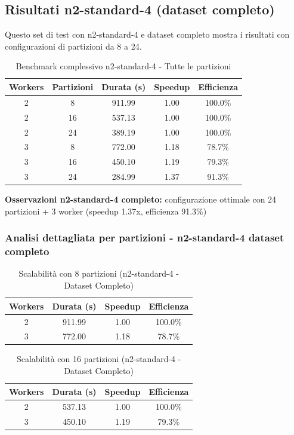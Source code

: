 \documentclass[8pt,a4paper]{article}
\begin{document}
\subsection{Risultati n2-standard-4 (dataset completo)}

Questo set di test con n2-standard-4 e dataset completo mostra i risultati con configurazioni di partizioni da 8 a 24.

\begin{table}[H]
\centering
\caption{Benchmark complessivo n2-standard-4 - Tutte le partizioni}
\label{tab:n2_complete_all}
\footnotesize
\begin{tabular}{|c|c|c|c|c|}
\hline
\textbf{Workers} & \textbf{Partizioni} & \textbf{Durata (s)} & \textbf{Speedup} & \textbf{Efficienza} \\
\hline
2 & 8 & 911.99 & 1.00 & 100.0\% \\
2 & 16 & 537.13 & 1.00 & 100.0\% \\
2 & 24 & 389.19 & 1.00 & 100.0\% \\
\hline
3 & 8 & 772.00 & 1.18 & 78.7\% \\
3 & 16 & 450.10 & 1.19 & 79.3\% \\
3 & 24 & 284.99 & 1.37 & 91.3\% \\
\hline
\end{tabular}
\end{table}

\textbf{Osservazioni n2-standard-4 completo:} configurazione ottimale con 24 partizioni + 3 worker (speedup 1.37x, efficienza 91.3\%)

\subsubsection{Analisi dettagliata per partizioni - n2-standard-4 dataset completo}

\begin{table}[H]
\centering
\caption{Scalabilità con 8 partizioni (n2-standard-4 - Dataset Completo)}
\begin{tabular}{|c|c|c|c|}
\hline
\textbf{Workers} & \textbf{Durata (s)} & \textbf{Speedup} & \textbf{Efficienza} \\
\hline
2 & 911.99 & 1.00 & 100.0\% \\
3 & 772.00 & 1.18 & 78.7\% \\
\hline
\end{tabular}
\end{table}

\begin{table}[H]
\centering
\caption{Scalabilità con 16 partizioni (n2-standard-4 - Dataset Completo)}
\begin{tabular}{|c|c|c|c|}
\hline
\textbf{Workers} & \textbf{Durata (s)} & \textbf{Speedup} & \textbf{Efficienza} \\
\hline
2 & 537.13 & 1.00 & 100.0\% \\
3 & 450.10 & 1.19 & 79.3\% \\
\hline
\end{tabular}
\end{table}
\end{document}
